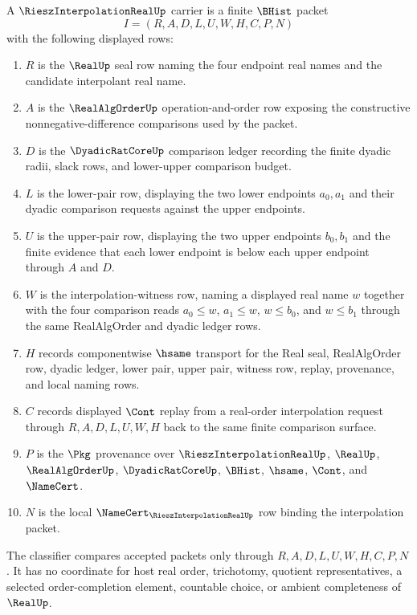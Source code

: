\begin{definition}
\label{def:riesz-interpolation-real-carrier}
A $\RieszInterpolationRealUp$ carrier is a finite $\BHist$ packet
$$
I=(R,A,D,L,U,W,H,C,P,N)
$$
with the following displayed rows:
\begin{enumerate}
\item $R$ is the $\RealUp$ seal row naming the four endpoint real names and the candidate interpolant real name.
\item $A$ is the $\RealAlgOrderUp$ operation-and-order row exposing the constructive nonnegative-difference comparisons used by the packet.
\item $D$ is the $\DyadicRatCoreUp$ comparison ledger recording the finite dyadic radii, slack rows, and lower-upper comparison budget.
\item $L$ is the lower-pair row, displaying the two lower endpoints $a_{0},a_{1}$ and their dyadic comparison requests against the upper endpoints.
\item $U$ is the upper-pair row, displaying the two upper endpoints $b_{0},b_{1}$ and the finite evidence that each lower endpoint is below each upper endpoint through $A$ and $D$.
\item $W$ is the interpolation-witness row, naming a displayed real name $w$ together with the four comparison reads $a_{0}\leq w$, $a_{1}\leq w$, $w\leq b_{0}$, and $w\leq b_{1}$ through the same RealAlgOrder and dyadic ledger rows.
\item $H$ records componentwise $\hsame$ transport for the Real seal, RealAlgOrder row, dyadic ledger, lower pair, upper pair, witness row, replay, provenance, and local naming rows.
\item $C$ records displayed $\Cont$ replay from a real-order interpolation request through $R,A,D,L,U,W,H$ back to the same finite comparison surface.
\item $P$ is the $\Pkg$ provenance over $\RieszInterpolationRealUp$, $\RealUp$, $\RealAlgOrderUp$, $\DyadicRatCoreUp$, $\BHist$, $\hsame$, $\Cont$, and $\NameCert$.
\item $N$ is the local $\NameCert_{\RieszInterpolationRealUp}$ row binding the interpolation packet.
\end{enumerate}
The classifier compares accepted packets only through $R,A,D,L,U,W,H,C,P,N$. It has no coordinate for host real order, trichotomy, quotient representatives, a selected order-completion element, countable choice, or ambient completeness of $\RealUp$.
\end{definition}

